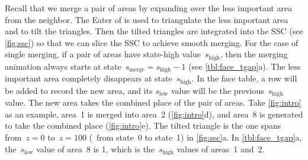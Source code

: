 \documentclass[]{interact}
\begin{document}
Recall that we merge a pair of areas by expanding over 
the less important area from the neighbor.
The Eater of \citet{Suba2014Merge} is used to 
triangulate the less important area and to tilt the triangles.
Then the tilted triangles are integrated into the SSC
(see \fig\ref{fig:ssc})
so that we can slice the SSC to achieve smooth merging.
For the case of single merging,
if a pair of areas have state-high value~$s_\mathrm{high}$,
then the merging animation 
always starts at state~$s_\mathrm{merge}=s_\mathrm{high}-1$
(see \tabl\ref{tbl:face_tgap}a).
The less important area completely disappears
at state~$s_\mathrm{high}$.
In the face table, a row will be added to record the new area, 
and its $s_\mathrm{low}$ value will be the previous~$s_\mathrm{high}$ value.
The new area takes the combined place of the pair of areas.
Take \ref{fig:intro} as an example, 
area~1 is merged into area~2 (\figs\ref{fig:intro}d), 
and area~8 is generated to take the combined place (\figs\ref{fig:intro}e).
The tilted triangle is the one spans 
from~$z= 0$ to~$z=100$ (\ie~from state~0 to state~1)
in \fig\ref{fig:ssc}a.
In \tabl\ref{tbl:face_tgap}a, 
the~$s_\mathrm{low}$ value of area~8 is 1,
which is the~$s_\mathrm{high}$ values of areas~1 and~2.
\end{document}
